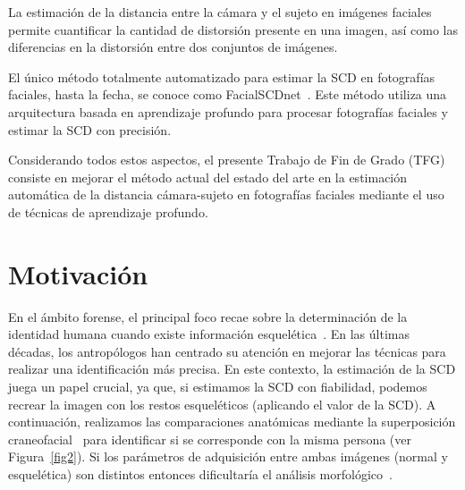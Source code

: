 La estimación de la distancia entre la cámara y el sujeto en imágenes faciales permite cuantificar la cantidad de distorsión presente en una imagen, así como las diferencias en la distorsión entre dos conjuntos de imágenes.


El único método totalmente automatizado para estimar la SCD en fotografías faciales, hasta la fecha, se conoce como FacialSCDnet~\cite{14}. Este método utiliza una arquitectura basada en aprendizaje profundo para procesar fotografías faciales y estimar la SCD con precisión.



Considerando todos estos aspectos, el presente Trabajo de Fin de Grado (TFG) consiste en mejorar el método actual del estado del arte en la estimación automática de la distancia cámara-sujeto en fotografías faciales mediante el uso de técnicas de aprendizaje profundo.


\section{Motivación}
En el ámbito forense, el principal foco recae sobre la determinación de la identidad humana cuando existe información esquelética~\cite{22}. En las últimas décadas, los antropólogos han centrado su atención en mejorar las técnicas para realizar una identificación más precisa. En este contexto, la estimación de la SCD juega un papel crucial, ya que, si estimamos la SCD con fiabilidad, podemos recrear la imagen con los restos esqueléticos (aplicando el valor de la SCD). A continuación, realizamos las comparaciones anatómicas mediante la superposición craneofacial~\cite{21} para identificar si se corresponde con la misma persona (ver Figura~\ref{fig2}). Si los parámetros de adquisición entre ambas imágenes (normal y esquelética) son distintos entonces dificultaría el análisis morfológico~\cite{23}.

